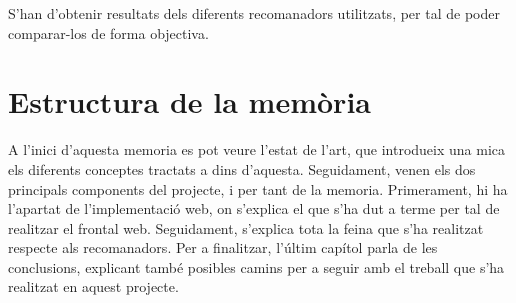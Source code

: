 S'han d'obtenir resultats dels diferents recomanadors utilitzats, per tal de poder comparar-los de forma objectiva.

\section{Estructura de la memòria}

A l'inici d'aquesta memoria es pot veure l'estat de l'art, que introdueix una mica els diferents conceptes tractats a dins d'aquesta. Seguidament, venen els dos principals components del projecte, i per tant de la memoria. Primerament, hi ha l'apartat de l'implementació web, on s'explica el que s'ha dut a terme per tal de realitzar el frontal web. Seguidament, s'explica tota la feina que s'ha realitzat respecte als recomanadors. Per a finalitzar, l'últim capítol parla de les conclusions, explicant també posibles camins per a seguir amb el treball que s'ha realitzat en aquest projecte.